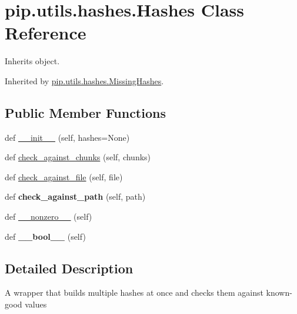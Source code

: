 \hypertarget{classpip_1_1utils_1_1hashes_1_1_hashes}{}\section{pip.\+utils.\+hashes.\+Hashes Class Reference}
\label{classpip_1_1utils_1_1hashes_1_1_hashes}


Inherits object.



Inherited by \hyperlink{classpip_1_1utils_1_1hashes_1_1_missing_hashes}{pip.\+utils.\+hashes.\+Missing\+Hashes}.

\subsection*{Public Member Functions}
\begin{DoxyCompactItemize}
\item 
def \hyperlink{classpip_1_1utils_1_1hashes_1_1_hashes_adf03141c0e021ec0ba650fd3bddd9956}{\+\_\+\+\_\+init\+\_\+\+\_\+} (self, hashes=None)
\item 
def \hyperlink{classpip_1_1utils_1_1hashes_1_1_hashes_aad529788518d843ce7f27f4149610411}{check\+\_\+against\+\_\+chunks} (self, chunks)
\item 
def \hyperlink{classpip_1_1utils_1_1hashes_1_1_hashes_a5066a598d8a19f1f00f1255cfea6d522}{check\+\_\+against\+\_\+file} (self, file)
\item 
\mbox{\label{classpip_1_1utils_1_1hashes_1_1_hashes_aa13f44776b535e91f204868d595b9bb3}} 
def {\bfseries check\+\_\+against\+\_\+path} (self, path)
\item 
def \hyperlink{classpip_1_1utils_1_1hashes_1_1_hashes_a029b6c565c89a8b11818d6da33fe4ee6}{\+\_\+\+\_\+nonzero\+\_\+\+\_\+} (self)
\item 
\mbox{\label{classpip_1_1utils_1_1hashes_1_1_hashes_ac4e2d6e7604b3d28312aace52e784455}} 
def {\bfseries \+\_\+\+\_\+bool\+\_\+\+\_\+} (self)
\end{DoxyCompactItemize}


\subsection{Detailed Description}
\begin{DoxyVerb}A wrapper that builds multiple hashes at once and checks them against
known-good values\end{DoxyVerb}
 

